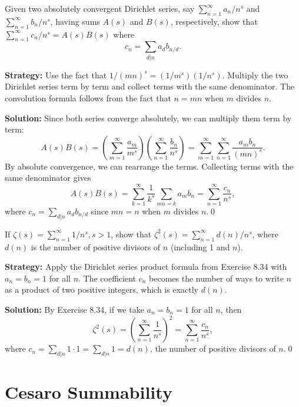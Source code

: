 \begin{problembox}
Given two absolutely convergent Dirichlet series, say \(\sum_{n=1}^{\infty} a_n / n^s\) and \(\sum_{n=1}^{\infty} b_n / n^s\), having sums \(A(s)\) and \(B(s)\), respectively, show that \(\sum_{n=1}^{\infty} c_n / n^s = A(s) B(s)\) where
\[c_n = \sum_{d|n} a_d b_{n/d}.\]
\end{problembox}

\noindent\textbf{Strategy:} Use the fact that \(1/(mn)^s = (1/m^s)(1/n^s)\). Multiply the two Dirichlet series term by term and collect terms with the same denominator. The convolution formula follows from the fact that \(n = mn\) when \(m\) divides \(n\).

\bigskip\noindent\textbf{Solution:}
Since both series converge absolutely, we can multiply them term by term:
\[A(s) B(s) = \left(\sum_{m=1}^{\infty} \frac{a_m}{m^s}\right) \left(\sum_{n=1}^{\infty} \frac{b_n}{n^s}\right) = \sum_{m=1}^{\infty} \sum_{n=1}^{\infty} \frac{a_m b_n}{(mn)^s}.\]
By absolute convergence, we can rearrange the terms. Collecting terms with the same denominator gives
\[A(s) B(s) = \sum_{k=1}^{\infty} \frac{1}{k^s} \sum_{mn=k} a_m b_n = \sum_{n=1}^{\infty} \frac{c_n}{n^s},\]
where \(c_n = \sum_{d|n} a_d b_{n/d}\) since \(mn = n\) when \(m\) divides \(n\).\qed



\begin{problembox}
If \(\zeta(s) = \sum_{n=1}^{\infty} 1/n^s, s > 1\), show that \(\zeta^2(s) = \sum_{n=1}^{\infty} d(n) / n^s\), where \(d(n)\) is the number of positive divisors of \(n\) (including 1 and \(n\)).
\end{problembox}

\noindent\textbf{Strategy:} Apply the Dirichlet series product formula from Exercise 8.34 with \(a_n = b_n = 1\) for all \(n\). The coefficient \(c_n\) becomes the number of ways to write \(n\) as a product of two positive integers, which is exactly \(d(n)\).

\bigskip\noindent\textbf{Solution:}
By Exercise 8.34, if we take \(a_n = b_n = 1\) for all \(n\), then
\[\zeta^2(s) = \left(\sum_{n=1}^{\infty} \frac{1}{n^s}\right)^2 = \sum_{n=1}^{\infty} \frac{c_n}{n^s},\]
where \(c_n = \sum_{d|n} 1 \cdot 1 = \sum_{d|n} 1 = d(n)\), the number of positive divisors of \(n\).\qed

\section{Cesaro Summability}



